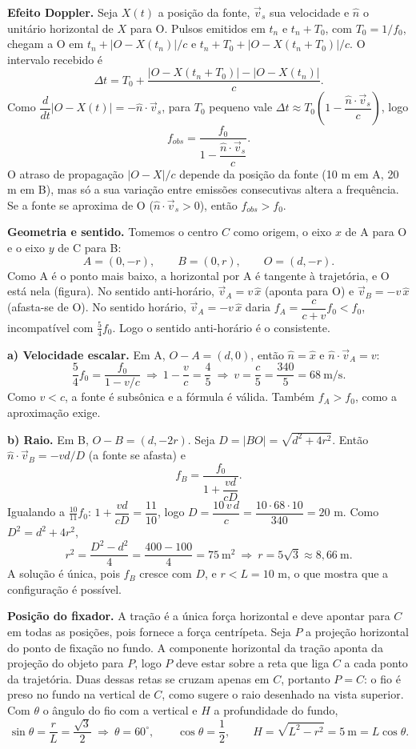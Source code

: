 \documentclass{article}%
\begin{document}
\textbf{Efeito Doppler.} Seja $X(t)$ a posição da fonte, $\vec v_s$ sua velocidade e $\hat n$ o unitário horizontal de $X$ para O. Pulsos emitidos em $t_n$ e $t_n+T_0$, com $T_0=1/f_0$, chegam a O em $t_n+|O-X(t_n)|/c$ e $t_n+T_0+|O-X(t_n+T_0)|/c$. O intervalo recebido é
\[
\Delta t=T_0+\frac{|O-X(t_n+T_0)|-|O-X(t_n)|}{c}.
\]
Como $\dfrac{d}{dt}|O-X(t)|=-\hat n\cdot\vec v_s$, para $T_0$ pequeno vale $\Delta t\approx T_0\left(1-\dfrac{\hat n\cdot\vec v_s}{c}\right)$, logo
\[
f_{obs}=\frac{f_0}{1-\dfrac{\hat n\cdot\vec v_s}{c}}.
\]
O atraso de propagação $|O-X|/c$ depende da posição da fonte (10 m em A, 20 m em B), mas só a sua variação entre emissões consecutivas altera a frequência. Se a fonte se aproxima de O ($\hat n\cdot\vec v_s>0$), então $f_{obs}>f_0$.

\textbf{Geometria e sentido.} Tomemos o centro $C$ como origem, o eixo $x$ de A para O e o eixo $y$ de C para B:
\[
A=(0,-r),\qquad B=(0,r),\qquad O=(d,-r).
\]
Como A é o ponto mais baixo, a horizontal por A é tangente à trajetória, e O está nela (figura). No sentido anti-horário, $\vec v_A=v\,\hat x$ (aponta para O) e $\vec v_B=-v\,\hat x$ (afasta-se de O). No sentido horário, $\vec v_A=-v\,\hat x$ daria $f_A=\dfrac{c}{c+v}f_0<f_0$, incompatível com $\tfrac54 f_0$. Logo o sentido anti-horário é o consistente.

\textbf{a) Velocidade escalar.} Em A, $O-A=(d,0)$, então $\hat n=\hat x$ e $\hat n\cdot\vec v_A=v$:
\[
\frac54 f_0=\frac{f_0}{1-v/c}\ \Rightarrow\ 1-\frac vc=\frac45\ \Rightarrow\ v=\frac c5=\frac{340}{5}=68\ \text{m/s}.
\]
Como $v<c$, a fonte é subsônica e a fórmula é válida. Também $f_A>f_0$, como a aproximação exige.

\textbf{b) Raio.} Em B, $O-B=(d,-2r)$. Seja $D=|BO|=\sqrt{d^2+4r^2}$. Então $\hat n\cdot\vec v_B=-vd/D$ (a fonte se afasta) e
\[
f_B=\frac{f_0}{1+\dfrac{vd}{cD}}.
\]
Igualando a $\tfrac{10}{11}f_0$: $1+\dfrac{vd}{cD}=\dfrac{11}{10}$, logo $D=\dfrac{10\,v\,d}{c}=\dfrac{10\cdot 68\cdot 10}{340}=20$ m. Como $D^2=d^2+4r^2$,
\[
r^2=\frac{D^2-d^2}{4}=\frac{400-100}{4}=75\ \text{m}^2\ \Rightarrow\ r=5\sqrt{3}\approx 8{,}66\ \text{m}.
\]
A solução é única, pois $f_B$ cresce com $D$, e $r<L=10$ m, o que mostra que a configuração é possível.

\textbf{Posição do fixador.} A tração é a única força horizontal e deve apontar para $C$ em todas as posições, pois fornece a força centrípeta. Seja $P$ a projeção horizontal do ponto de fixação no fundo. A componente horizontal da tração aponta da projeção do objeto para $P$, logo $P$ deve estar sobre a reta que liga $C$ a cada ponto da trajetória. Duas dessas retas se cruzam apenas em $C$, portanto $P=C$: o fio é preso no fundo na vertical de $C$, como sugere o raio desenhado na vista superior. Com $\theta$ o ângulo do fio com a vertical e $H$ a profundidade do fundo,
\[
\sin\theta=\frac rL=\frac{\sqrt3}{2}\ \Rightarrow\ \theta=60^\circ,\qquad \cos\theta=\frac12,\qquad H=\sqrt{L^2-r^2}=5\ \text{m}=L\cos\theta.
\]
\end{document}
